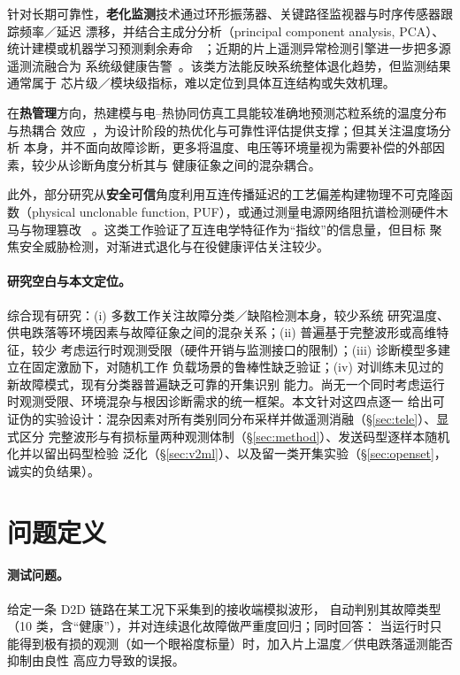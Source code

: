 \documentclass[11pt,a4paper,fontset=mac]{ctexart}
\begin{document}
针对长期可靠性，\textbf{老化监测}技术通过环形振荡器、关键路径监视器与时序传感器跟踪频率／延迟
漂移，并结合主成分分析（principal component analysis, PCA）、统计建模或机器学习预测剩余寿命
~\cite{lanzieri2024aging,ali2020fusion}；近期的片上遥测异常检测引擎进一步把多源遥测流融合为
系统级健康告警~\cite{ortega2025octane}。该类方法能反映系统整体退化趋势，但监测结果通常属于
芯片级／模块级指标，难以定位到具体互连结构或失效机理。

在\textbf{热管理}方向，热建模与电–热协同仿真工具能较准确地预测芯粒系统的温度分布与热耦合
效应~\cite{zhu2025ice,ma2024cosim}，为设计阶段的热优化与可靠性评估提供支撑；但其关注温度场分析
本身，并不面向故障诊断，更多将温度、电压等环境量视为需要补偿的外部因素，较少从诊断角度分析其与
健康征象之间的混杂耦合。

此外，部分研究从\textbf{安全可信}角度利用互连传播延迟的工艺偏差构建物理不可克隆函数（physical
unclonable function, PUF），或通过测量电源网络阻抗谱检测硬件木马与物理篡改
~\cite{deric2022puf,monfared2025quake}。这类工作验证了互连电学特征作为“指纹”的信息量，但目标
聚焦安全威胁检测，对渐进式退化与在役健康评估关注较少。

\paragraph{研究空白与本文定位。}综合现有研究：(i) 多数工作关注故障分类／缺陷检测本身，较少系统
研究温度、供电跌落等环境因素与故障征象之间的混杂关系；(ii) 普遍基于完整波形或高维特征，较少
考虑运行时观测受限（硬件开销与监测接口的限制）；(iii) 诊断模型多建立在固定激励下，对随机工作
负载场景的鲁棒性缺乏验证；(iv) 对训练未见过的新故障模式，现有分类器普遍缺乏可靠的开集识别
能力。尚无一个同时考虑运行时观测受限、环境混杂与根因诊断需求的统一框架。本文针对这四点逐一
给出可证伪的实验设计：混杂因素对所有类别同分布采样并做遥测消融（\S\ref{sec:tele}）、显式区分
完整波形与有损标量两种观测体制（\S\ref{sec:method}）、发送码型逐样本随机化并以留出码型检验
泛化（\S\ref{sec:v2ml}）、以及留一类开集实验（\S\ref{sec:openset}，诚实的负结果）。

\section{问题定义}

\paragraph{测试问题。} 给定一条 D2D 链路在某工况下采集到的接收端模拟波形，
自动判别其故障类型（10 类，含“健康”），并对连续退化故障做严重度回归；同时回答：
当运行时只能得到极有损的观测（如一个眼裕度标量）时，加入片上温度／供电跌落遥测能否抑制由良性
高应力导致的误报。
\end{document}
